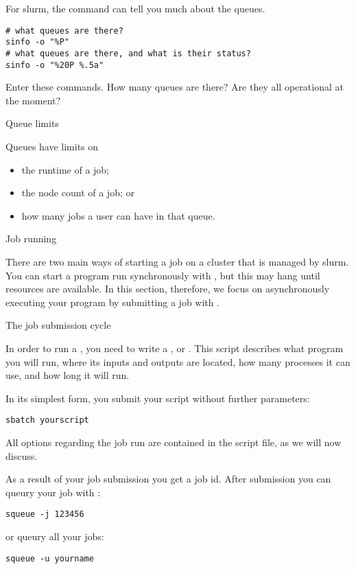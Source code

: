 For slurm, the  command can tell you much about the queues.
\begin{verbatim}
# what queues are there?
sinfo -o "%P"
# what queues are there, and what is their status?
sinfo -o "%20P %.5a"
\end{verbatim}

\begin{exercise}
  Enter these commands. How many queues are there? Are they all
  operational at the moment?
\end{exercise}

 {Queue limits}

Queues have limits on
\begin{itemize}
\item the runtime of a job;
\item the node count of a job; or
\item how many jobs a user can have in that queue.
\end{itemize}

 {Job running}

There are two main ways of starting a job on a cluster that is
managed by slurm.
You can start a program run synchronously with ,
but this may hang until resources are available.
In this section, therefore, we focus on asynchronously executing
your program by submitting a job with . 

 {The job submission cycle}

In order to run a ,
you need to write a ,
or .
This script describes what program you will run,
where its inputs and outputs are located,
how many processes it can use, and how long it will run.

In its simplest form, you submit your script without further parameters:
\begin{verbatim}
sbatch yourscript
\end{verbatim}
All options regarding the job run are contained in the script file, as we
will now discuss.

As a result of your job submission you get a job id.
After submission you can queury your job with :
\begin{verbatim}
squeue -j 123456
\end{verbatim}
or queury all your jobs:
\begin{verbatim}
squeue -u yourname
\end{verbatim}


